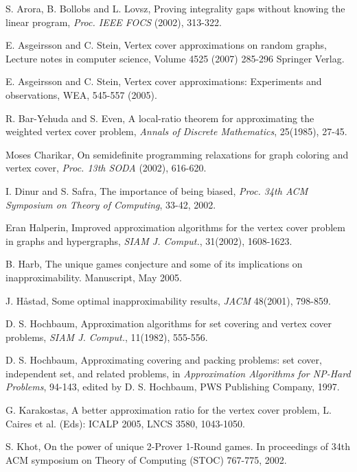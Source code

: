\documentclass[12pt]{article}
\begin{document}
{ \small 

\begin{thebibliography}{999}
 S. Arora, B. Bollobs and L.
Lovsz, Proving integrality gaps without knowing the
linear program, {\it Proc. IEEE FOCS} (2002), 313-322.

 E. Asgeirsson and C. Stein, Vertex cover approximations on random graphs,
Lecture notes in computer science, Volume 4525 (2007) 285-296
Springer Verlag.

 E. Asgeirsson and C. Stein, Vertex cover
approximations: Experiments and observations, WEA, 545-557 (2005).

 R. Bar-Yehuda and S. Even, A local-ratio theorem for approximating the weighted vertex cover problem,
 {\it Annals of Discrete Mathematics}, 25(1985), 27-45.

 Moses Charikar, On semidefinite programming
relaxations for graph coloring and vertex cover, {\it Proc. 13th
SODA} (2002), 616-620.

 I. Dinur and S. Safra, The importance of being
biased, {\it Proc. 34th ACM Symposium on Theory of Computing},
33-42, 2002.

 Eran Halperin, Improved approximation algorithms for the vertex cover problem
in graphs and hypergraphs, {\it SIAM J. Comput.}, 31(2002),
1608-1623.

 B. Harb, The unique games conjecture and some of its
implications on inapproximability. Manuscript, May 2005.

 J. H{\aa}stad, Some optimal inapproximability results,
{\it JACM} 48(2001), 798-859.

 D. S. Hochbaum, Approximation algorithms for set covering and vertex cover problems,
{\it SIAM J. Comput.}, 11(1982), 555-556.


 D. S. Hochbaum, Approximating covering and packing problems: set cover, independent set,
and related problems, in {\it Approximation Algorithms for NP-Hard
Problems}, 94-143, edited by D. S. Hochbaum, PWS Publishing Company,
1997.

 G. Karakostas, A better approximation ratio for
the vertex cover problem, L. Caires et al. (Eds): ICALP 2005, LNCS
3580, 1043-1050.

 S. Khot, On the power of unique 2-Prover 1-Round
games. In proceedings of 34th ACM symposium on Theory of Computing
(STOC) 767-775, 2002.


\end{thebibliography}}
\end{document}
